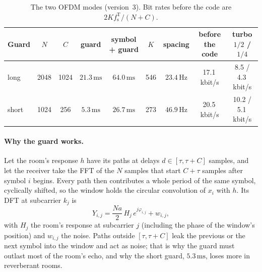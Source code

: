 \documentclass[11pt,a4paper]{article}
\newcommand{\Hz}{\,\mathrm{Hz}}
\newcommand{\ms}{\,\mathrm{ms}}
\newcommand{\fsT}{f_{\mathrm{s}}^{\mathrm{T}}}
\theoremstyle{remark}
\begin{document}
\begin{table}[ht]
\centering
\caption{The two OFDM modes (version~3). Bit rates before the code are $2K\fsT/(N+C)$.}
\label{tab:ofdm}
\small
\setlength{\tabcolsep}{4.5pt}
\begin{tabular}{lcccccccc}
\toprule
Guard & $N$ & $C$ & guard & symbol + guard & $K$ & spacing & before the code & turbo $1/2$ / $1/4$\\
\midrule
long & 2048 & 1024 & $21.3\ms$ & $64.0\ms$ & 546 & $23.4\Hz$ & 17.1\,kbit/s & 8.5 / 4.3\,kbit/s\\
short & 1024 & 256 & $5.3\ms$ & $26.7\ms$ & 273 & $46.9\Hz$ & 20.5\,kbit/s & 10.2 / 5.1\,kbit/s\\
\bottomrule
\end{tabular}
\end{table}

\paragraph{Why the guard works.}
Let the room's response $h$ have its paths at delays $d \in [\tau, \tau + C]$ samples, and let the receiver take the FFT of the $N$ samples that start $C + \tau$ samples after symbol $i$ begins. Every path then contributes a whole period of the same symbol, cyclically shifted, so the window holds the circular convolution of $x_i$ with $h$. Its DFT at subcarrier $k_j$ is
\begin{equation}
Y_{i,j} = \frac{N a}{2}\, H_j\, e^{j\varphi_{i,j}} + w_{i,j},
\label{eq:ofdmrx}
\end{equation}
with $H_j$ the room's response at subcarrier $j$ (including the phase of the window's position) and $w_{i,j}$ the noise. Paths outside $[\tau, \tau + C]$ leak the previous or the next symbol into the window and act as noise; that is why the guard must outlast most of the room's echo, and why the short guard, $5.3\ms$, loses more in reverberant rooms.
\end{document}
